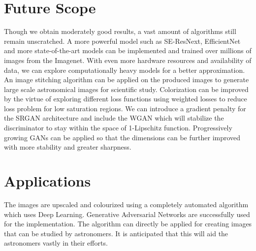 \documentclass[oneside,a4paper,12pt]{report}
\begin{document}
\section{Future Scope}
\hspace*{0.25 in}Though we obtain moderately good results, a vast amount of algorithms still remain unscratched. A more powerful model such as SE-ResNext, EfficientNet and more state-of-the-art models can be implemented and trained over millions of images from the Imagenet. With even more hardware resources and availability of data, we can explore computationally heavy models for a better approximation. An image stitching algorithm can be applied on the produced images to generate large scale astronomical images for scientific study. Colorization can be improved by the virtue of exploring different loss functions using weighted losses to reduce loss problem for low saturation regions. We can introduce a gradient penalty for the SRGAN architecture and include the WGAN \citep{arjovsky2017wasserstein} which will stabilize the discriminator to stay within the space of 1-Lipschitz function. Progressively growing GANs \citep{karras2018progressive} can be applied so that the dimensions can be further improved with more stability and greater sharpness.

\section{Applications}
\hspace*{0.25 in}The images are upscaled and colourized using a completely automated algorithm which uses Deep Learning. Generative Adversarial Networks are  successfully used for the implementation. The algorithm can directly be applied for creating images that can be studied by astronomers. It is anticipated that this will aid the astronomers vastly in their efforts.



\end{document}
